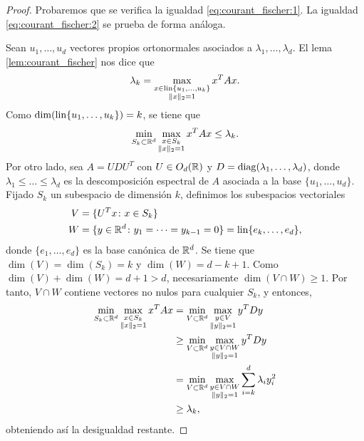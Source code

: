 \begin{proof}
    Probaremos que se verifica la igualdad \ref{eq:courant_fischer:1}. La igualdad \ref{eq:courant_fischer:2} se prueba de forma análoga.

    Sean  $u_1, \dots, u_d$ vectores propios ortonormales asociados a $\lambda_1,\dots,\lambda_d$. El lema \ref{lem:courant_fischer} nos dice que
    \[ \lambda_k = \max_{\substack{x \in \operatorname{lin}\{u_1,\dots,u_k\} \\ \|x\|_2 = 1}} x^TAx. \]
    Como $\dim(\operatorname{lin}\{u_1,\dots,u_k\}) = k$, se tiene que
    \[ \min_{S_k \subset \mathbb{R}^d} \max_{\substack{x \in S_k \\ \|x\|_2 = 1}} x^TAx \le \lambda_k. \]
    Por otro lado, sea $A = UDU^T$ con $U \in O_d(\mathbb{R})$ y $D = \operatorname{diag}(\lambda_1,\dots,\lambda_d)$, donde $\lambda_1 \le \dots \le \lambda_d$ es la descomposición espectral de $A$ asociada a la base $\{u_1,\dots,u_d\}$.
    Fijado $S_k$ un subespacio de dimensión $k$, definimos los subespacios vectoriales
    \begin{align*}
        V &= \{ U^Tx \colon x \in S_k \} \\
        W &= \{ y \in \mathbb{R}^d \colon y_1 = \dots = y_{k-1} = 0 \} = \operatorname{lin}\{e_k,\dots,e_d\},
    \end{align*}
    donde $\{e_1,\dots,e_d\}$ es la base canónica de $\mathbb{R}^d$. Se tiene que $\dim(V) = \dim(S_k) = k$ y $\dim(W) = d-k+1$. Como $\dim(V) + \dim(W) = d+1 > d$, necesariamente $\dim(V\cap W) \ge 1$. Por tanto, $V \cap W$ contiene vectores no nulos para cualquier $S_k$, y entonces,
    \begin{align*}
         \min_{S_{k} \subset \mathbb{R}^d} \max_{\substack{x \in S_{k} \\ \|x\|_2 = 1}} x^TAx &= \min_{V \subset \mathbb{R}^d} \max_{\substack{y \in V \\ \|y\|_2 = 1}} y^TDy \\
                                                                                      &\ge \min_{V \subset \mathbb{R}^d} \max_{\substack{y \in V\cap W \\ \|y\|_2 = 1}} y^TDy \\
                                                                                      &= \min_{V \subset \mathbb{R}^d} \max_{\substack{y \in V \cap W \\ \|y\|_2 = 1}} \sum_{i=k}^d \lambda_i y_i^2 \\
                                                                                      &\ge \lambda_k,
    \end{align*}
    obteniendo así la desigualdad restante.
\end{proof}

